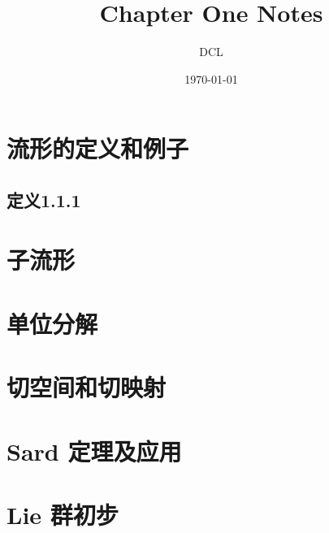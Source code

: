 \documentclass[UTF8]{ctexart}
\begin{document}
    \title{Chapter One Notes}
    \author{DCL}
    \date{\today}
\maketitle
\tableofcontents
\section{流形的定义和例子}
\subsection{定义1.1.1}
\section{子流形}
\section{单位分解}
\section{切空间和切映射}
\section{Sard 定理及应用}
\section{Lie 群初步}
\end{document}
